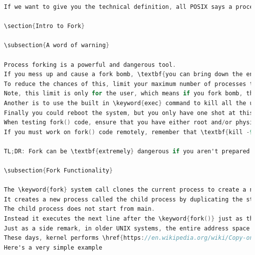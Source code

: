 \begin{itemize}
\begin{lstlisting}[language=C]
If we want to give you the technical definition, all POSIX says a process needs is a thread and address space, but most kernel developers and users know that really isn't enough \cite{process_def}.

\section{Intro to Fork}

\subsection{A word of warning}

Process forking is a powerful and dangerous tool.
If you mess up and cause a fork bomb, \textbf{you can bring down the entire system}.
To reduce the chances of this, limit your maximum number of processes to a small number e.g 40 by typing \keyword{ulimit\ -u\ 40} into a command line.
Note, this limit is only for the user, which means if you fork bomb, then you won't be able to kill all of the processes you just created since calling \keyword{killall} requires your shell to \keyword{fork()} \ldots{} ironic right? One solution is to spawn another shell instance as another user (for example root) before hand and kill processes from there.
Another is to use the built in \keyword{exec} command to kill all the user processes (careful you only have one shot at this).
Finally you could reboot the system, but you only have one shot at this with the exec function.
When testing fork() code, ensure that you have either root and/or physical access to the machine involved.
If you must work on fork() code remotely, remember that \textbf{kill -9 -1} will save you in the event of an emergency.

TL;DR: Fork can be \textbf{extremely} dangerous if you aren't prepared for it. \textbf{You have been warned.}

\subsection{Fork Functionality}

The \keyword{fork} system call clones the current process to create a new process.
It creates a new process called the child process by duplicating the state of the existing process with a few minor differences.
The child process does not start from main.
Instead it executes the next line after the \keyword{fork()} just as the parent process does.
Just as a side remark, in older UNIX systems, the entire address space of the parent process was directly copied regardless of whether the resource was modified or not.
These days, kernel performs \href{https://en.wikipedia.org/wiki/Copy-on-write}{copy-on-write}, which saves a lot of resources, while being very time efficient \cite[Copy-on-write section]{Bovet:2005:ULK:1077084}.
Here's a very simple example


\end{lstlisting}
\end{itemize}
